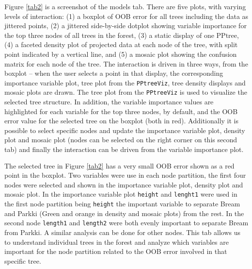 \documentclass[smallextended,natbib]{svjour3}\usepackage[]{graphicx}\usepackage[]{xcolor}
\begin{document}
Figure \ref{tab2} is a screenshot of the models tab. There are five plots, with varying levels of interaction: (1) a boxplot of OOB error for all trees including the data as jittered points, (2) a jittered side-by-side dotplot showing variable importance for the top three nodes of all trees in the forest, (3) a static display of one PPtree, (4) a faceted density plot of projected data at each node of the tree, with split point indicated by a vertical line, and (5) a mosaic plot showing the confusion matrix for each node of the tree.  The interaction is driven in three ways, from the boxplot -- when the user selects a point in that display, the corresponding importance variable plot, tree plot from the \verb#PPtreeViz#, tree density displays and mosaic plots are drawn. The tree plot from the \verb#PPtreeViz# is used to visualize the selected tree structure. In addition, the variable importance values are highlighted for each variable for the top three nodes, by default, and the OOB error value for the selected tree on the boxplot (both in red).
Additionally it is possible to select specific nodes and update the importance variable plot, density plot and mosaic plot (nodes can be selected on the right corner on this second tab) and finally the interaction can be driven from the variable importance plot.

The selected tree in Figure \ref{tab2} has a very small OOB error shown as a red point in the boxplot. Two variables were use in each node partition, the first four nodes were selected and shown in the importance variable plot, density plot and mosaic plot. In the importance variable plot \verb#height# and \verb#lenght1# were used in the first node partition being \verb#height# the important variable to separate Bream and Parkki (Green and orange in density and mosaic plots) from the rest. In the second node \verb#length1# and \verb#length2# were both evenly important  to separate Bream from Parkki. A similar analysis can be done for other nodes. This tab allows us to understand individual trees in the forest and analyze which variables are important for the node partition related to the OOB error involved in that specific tree.
\end{document}
